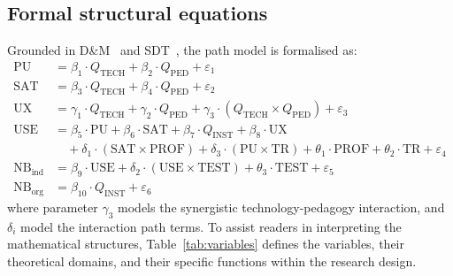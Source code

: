 \documentclass[11pt,a4paper]{article}
\begin{document}
\subsection{Formal structural equations}
Grounded in D\&M~\cite{b31} and SDT~\cite{b12}, the path model is formalised as:
\begin{align}
  \text{PU} &= \beta_1 \cdot Q_{\text{TECH}} + \beta_2 \cdot Q_{\text{PED}} + \varepsilon_1 \\
  \text{SAT} &= \beta_3 \cdot Q_{\text{TECH}} + \beta_4 \cdot Q_{\text{PED}} + \varepsilon_2 \\
  \text{UX} &= \gamma_1 \cdot Q_{\text{TECH}} + \gamma_2 \cdot Q_{\text{PED}} + \gamma_3 \cdot (Q_{\text{TECH}} \times Q_{\text{PED}}) + \varepsilon_3 \\
  \text{USE} &= \beta_5 \cdot \text{PU} + \beta_6 \cdot \text{SAT} + \beta_7 \cdot Q_{\text{INST}} + \beta_8 \cdot \text{UX} \nonumber \\
             &\quad + \delta_1 \cdot (\text{SAT} \times \text{PROF}) + \delta_3 \cdot (\text{PU} \times \text{TR}) + \theta_1 \cdot \text{PROF} + \theta_2 \cdot \text{TR} + \varepsilon_4 \\
  \text{NB}_{\text{ind}} &= \beta_9 \cdot \text{USE} + \delta_2 \cdot (\text{USE} \times \text{TEST}) + \theta_3 \cdot \text{TEST} + \varepsilon_5 \\
  \text{NB}_{\text{org}} &= \beta_{10} \cdot Q_{\text{INST}} + \varepsilon_6
\end{align}
where parameter $\gamma_3$ models the synergistic technology-pedagogy interaction, and $\delta_i$ model the interaction path terms. To assist readers in interpreting the mathematical structures, Table~\ref{tab:variables} defines the variables, their theoretical domains, and their specific functions within the research design.
\end{document}
